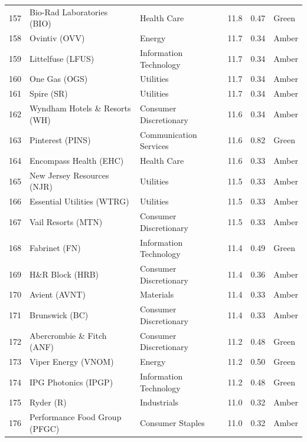 \documentclass[11pt,a4paper]{article}
\begin{document}
{\begin{longtable}{r p{4.6cm} p{3cm} r r l}
157 & Bio-Rad Laboratories (BIO) & Health Care & 11.8 & 0.47 & \cellcolor[HTML]{C6EFCE}Green \\
158 & Ovintiv (OVV) & Energy & 11.7 & 0.34 & \cellcolor[HTML]{FFEB9C}Amber \\
159 & Littelfuse (LFUS) & Information Technology & 11.7 & 0.34 & \cellcolor[HTML]{FFEB9C}Amber \\
160 & One Gas (OGS) & Utilities & 11.7 & 0.34 & \cellcolor[HTML]{FFEB9C}Amber \\
161 & Spire (SR) & Utilities & 11.7 & 0.34 & \cellcolor[HTML]{FFEB9C}Amber \\
162 & Wyndham Hotels \& Resorts (WH) & Consumer Discretionary & 11.6 & 0.34 & \cellcolor[HTML]{FFEB9C}Amber \\
163 & Pinterest (PINS) & Communication Services & 11.6 & 0.82 & \cellcolor[HTML]{C6EFCE}Green \\
164 & Encompass Health (EHC) & Health Care & 11.6 & 0.33 & \cellcolor[HTML]{FFEB9C}Amber \\
165 & New Jersey Resources (NJR) & Utilities & 11.5 & 0.33 & \cellcolor[HTML]{FFEB9C}Amber \\
166 & Essential Utilities (WTRG) & Utilities & 11.5 & 0.33 & \cellcolor[HTML]{FFEB9C}Amber \\
167 & Vail Resorts (MTN) & Consumer Discretionary & 11.5 & 0.33 & \cellcolor[HTML]{FFEB9C}Amber \\
168 & Fabrinet (FN) & Information Technology & 11.4 & 0.49 & \cellcolor[HTML]{C6EFCE}Green \\
169 & H\&R Block (HRB) & Consumer Discretionary & 11.4 & 0.36 & \cellcolor[HTML]{FFEB9C}Amber \\
170 & Avient (AVNT) & Materials & 11.4 & 0.33 & \cellcolor[HTML]{FFEB9C}Amber \\
171 & Brunswick (BC) & Consumer Discretionary & 11.4 & 0.33 & \cellcolor[HTML]{FFEB9C}Amber \\
172 & Abercrombie \& Fitch (ANF) & Consumer Discretionary & 11.2 & 0.48 & \cellcolor[HTML]{C6EFCE}Green \\
173 & Viper Energy (VNOM) & Energy & 11.2 & 0.50 & \cellcolor[HTML]{C6EFCE}Green \\
174 & IPG Photonics (IPGP) & Information Technology & 11.2 & 0.48 & \cellcolor[HTML]{C6EFCE}Green \\
175 & Ryder (R) & Industrials & 11.0 & 0.32 & \cellcolor[HTML]{FFEB9C}Amber \\
176 & Performance Food Group (PFGC) & Consumer Staples & 11.0 & 0.32 & \cellcolor[HTML]{FFEB9C}Amber \\

\end{longtable}}
\end{document}
